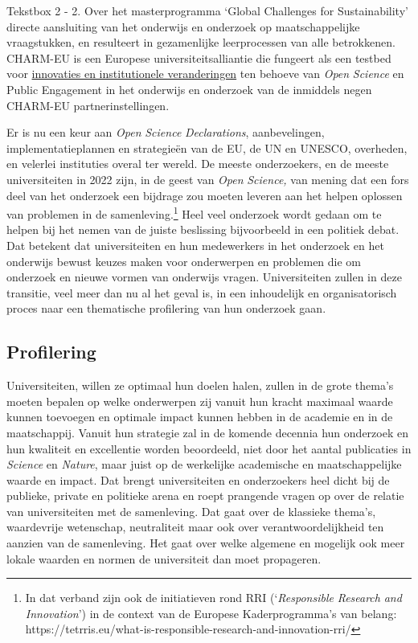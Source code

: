 \documentclass[smallauthor, chapterhaspagenum, nochapterinheader, pagenuminheader,  bigchapnum,medium2, tocpages,  garamond, titleinheader]{jote-book}
\begin{document}
\begin{bookbox}{Tekstbox 2 - 2. Over het masterprogramma ‘Global Challenges for Sustainability'}
directe aansluiting van het onderwijs en onderzoek op maatschappelijke vraagstukken, en resulteert in gezamenlijke leerprocessen van alle betrokkenen. CHARM-EU is een Europese universiteitsalliantie die fungeert als een testbed voor \href{https://www.charm-eu.eu/torch}{innovaties en institutionele veranderingen} ten behoeve van \emph{Open }\emph{Science} en Public Engagement in het onderwijs en onderzoek van de inmiddels negen CHARM-EU partnerinstellingen.
	\end{bookbox}

	Er is nu een keur aan \emph{Open }\emph{Science} \emph{Declarations}, aanbevelingen, implementatieplannen en strategieën van de EU, de UN en UNESCO, overheden, en velerlei instituties overal ter wereld. De meeste onderzoekers, en de meeste universiteiten in 2022 zijn, in de geest van \emph{Open }\emph{Science}\emph{,} van mening dat een fors deel van het onderzoek een bijdrage zou moeten leveren aan het helpen oplossen van problemen in de samenleving.\footnote{In dat verband zijn ook de initiatieven rond RRI (‘\emph{Responsible}\emph{ Research }\emph{and}\emph{ }\emph{Innovation}') in de context van de Europese Kaderprogramma's van belang: https://tetrris.eu/what-is-responsible-research-and-innovation-rri/} Heel veel onderzoek wordt gedaan om te helpen bij het nemen van de juiste beslissing bijvoorbeeld in een politiek debat. Dat betekent dat universiteiten en hun medewerkers in het onderzoek en het onderwijs bewust keuzes maken voor onderwerpen en problemen die om onderzoek en nieuwe vormen van onderwijs vragen. Universiteiten zullen in deze transitie, veel meer dan nu al het geval is, in een inhoudelijk en organisatorisch proces naar een thematische profilering van hun onderzoek gaan.



	\subsection{Profilering}



	Universiteiten, willen ze optimaal hun doelen halen, zullen in de grote thema's moeten bepalen op welke onderwerpen zij vanuit hun kracht maximaal waarde kunnen toevoegen en optimale impact kunnen hebben in de academie en in de maatschappij. Vanuit hun strategie zal in de komende decennia hun onderzoek en hun kwaliteit en excellentie worden beoordeeld, niet door het aantal publicaties in \emph{Science} en \emph{Nature}, maar juist op de werkelijke academische en maatschappelijke waarde en impact. Dat brengt universiteiten en onderzoekers heel dicht bij de publieke, private en politieke arena en roept prangende vragen op over de relatie van universiteiten met de samenleving. Dat gaat over de klassieke thema's, waardevrije wetenschap, neutraliteit maar ook over verantwoordelijkheid ten aanzien van de samenleving. Het gaat over welke algemene en mogelijk ook meer lokale waarden en normen de universiteit dan moet propageren.
\end{document}
